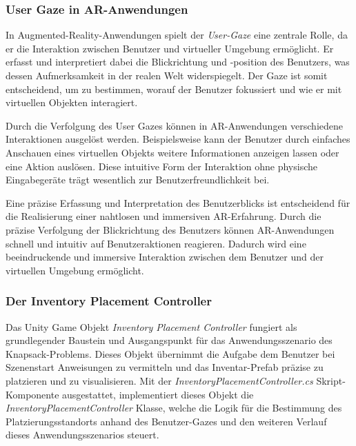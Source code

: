 \subsubsection{User Gaze in AR-Anwendungen}
In Augmented-Reality-Anwendungen spielt der \textit{User-Gaze} eine zentrale Rolle, da er die Interaktion zwischen Benutzer
und virtueller Umgebung ermöglicht. Er erfasst und interpretiert dabei die Blickrichtung und -position des Benutzers,
was dessen Aufmerksamkeit in der realen Welt widerspiegelt. Der Gaze ist somit entscheidend, um zu bestimmen, worauf der
Benutzer fokussiert und wie er mit virtuellen Objekten interagiert.

Durch die Verfolgung des User Gazes können in AR-Anwendungen verschiedene Interaktionen ausgelöst werden. Beispielsweise
kann der Benutzer durch einfaches Anschauen eines virtuellen Objekts weitere Informationen anzeigen lassen oder eine
Aktion auslösen. Diese intuitive Form der Interaktion ohne physische Eingabegeräte trägt wesentlich zur Benutzerfreundlichkeit
bei.

Eine präzise Erfassung und Interpretation des Benutzerblicks ist entscheidend für die Realisierung einer nahtlosen und
immersiven AR-Erfahrung. Durch die präzise Verfolgung der Blickrichtung des Benutzers können AR-Anwendungen schnell und
intuitiv auf Benutzeraktionen reagieren. Dadurch wird eine beeindruckende und immersive Interaktion zwischen dem Benutzer
und der virtuellen Umgebung ermöglicht.

\subsubsection{Der Inventory Placement Controller}
Das Unity Game Objekt \textit{Inventory Placement Controller} fungiert als grundlegender Baustein und Ausgangspunkt für
das Anwendungsszenario des Knapsack-Problems. Dieses Objekt übernimmt die Aufgabe dem Benutzer bei Szenenstart Anweisungen
zu vermitteln und das Inventar-Prefab präzise zu platzieren und zu visualisieren. Mit der \textit{InventoryPlacementController.cs}
Skript-Komponente ausgestattet, implementiert dieses Objekt die \textit{InventoryPlacementController} Klasse, welche die
Logik für die Bestimmung des Platzierungsstandorts anhand des Benutzer-Gazes und den weiteren Verlauf dieses Anwendungsszenarios
steuert.

